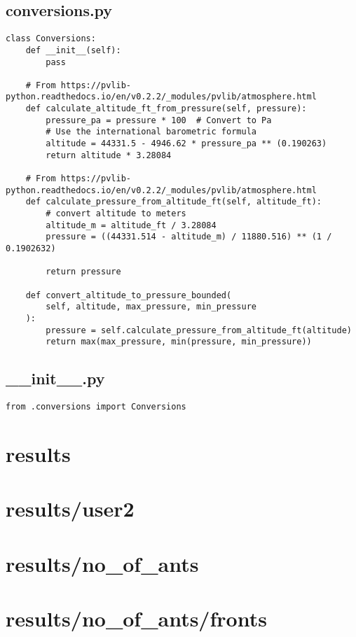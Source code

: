 \subsection{conversions.py}
\begin{verbatim}
class Conversions:
    def __init__(self):
        pass

    # From https://pvlib-python.readthedocs.io/en/v0.2.2/_modules/pvlib/atmosphere.html
    def calculate_altitude_ft_from_pressure(self, pressure):
        pressure_pa = pressure * 100  # Convert to Pa
        # Use the international barometric formula
        altitude = 44331.5 - 4946.62 * pressure_pa ** (0.190263)
        return altitude * 3.28084

    # From https://pvlib-python.readthedocs.io/en/v0.2.2/_modules/pvlib/atmosphere.html
    def calculate_pressure_from_altitude_ft(self, altitude_ft):
        # convert altitude to meters
        altitude_m = altitude_ft / 3.28084
        pressure = ((44331.514 - altitude_m) / 11880.516) ** (1 / 0.1902632)

        return pressure

    def convert_altitude_to_pressure_bounded(
        self, altitude, max_pressure, min_pressure
    ):
        pressure = self.calculate_pressure_from_altitude_ft(altitude)
        return max(max_pressure, min(pressure, min_pressure))

\end{verbatim}
\subsection{__init__.py}
\begin{verbatim}
from .conversions import Conversions

\end{verbatim}
\section{results}
\section{results/user2}
\section{results/no_of_ants}
\section{results/no_of_ants/fronts}
